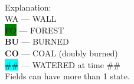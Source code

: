 \\
Explanation:\\
\colorbox{white}{\color[gray]{0.5}WA}  ---  WALL\\
\colorbox{green}{\color[gray]{0.5}FO}  ---  FOREST\\
{\color[rgb]{1,0,0}\textbf{BU}}  ---  BURNED\\
{\color[rgb]{0,0,0}\textbf{CO}}  ---  COAL (doubly burned)\\
\colorbox{cyan}{\#\#}  ---  WATERED at time \#\#\\
Fields can have more than 1 state.